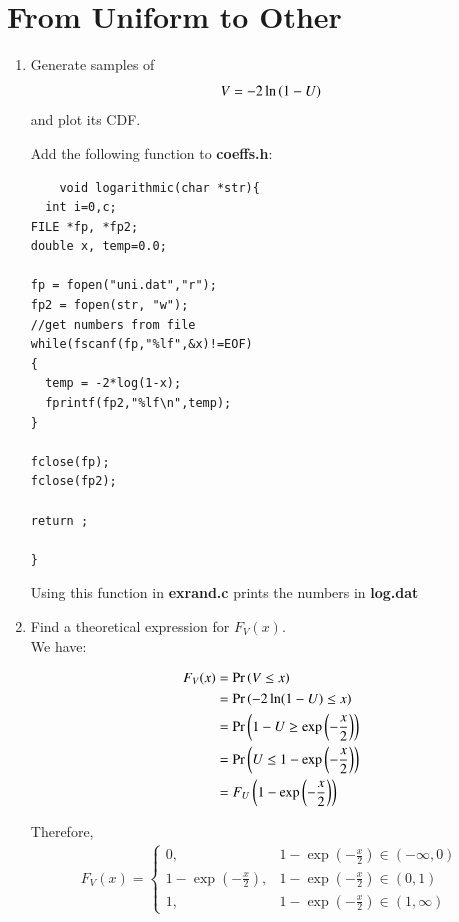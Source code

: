 \documentclass[journal,12pt,twocolumn]{IEEEtran}
\renewcommand\thesection{\arabic{section}}
\begin{document}
\section{From Uniform to Other}
\begin{enumerate}[label=\thesection.\arabic*
,ref=\thesection.\theenumi]
%
\item
Generate samples of 
%
\begin{equation}
V = -2\ln\left(1-U\right)
\end{equation}
%
and plot its CDF.  
\solution 

Add the following function to \textbf{coeffs.h}:
\begin{lstlisting}
    void logarithmic(char *str){
  int i=0,c;
FILE *fp, *fp2;
double x, temp=0.0;

fp = fopen("uni.dat","r");
fp2 = fopen(str, "w");
//get numbers from file
while(fscanf(fp,"%lf",&x)!=EOF)
{
  temp = -2*log(1-x);
  fprintf(fp2,"%lf\n",temp);
}

fclose(fp);
fclose(fp2);

return ;

}
    \end{lstlisting}

Using this function in \textbf{exrand.c} prints the numbers in 
\textbf{log.dat} 


\item Find a theoretical expression for $F_V(x)$.
\\
\solution  We have:
    
\begin{align}
F_V(x) &= \Pr\left(V \leq x\right) \\
&= \Pr\left(-2\ln(1-U) \leq x\right) \\
&= \Pr\left(1-U \geq	\exp{\left(-\frac{x}{2}\right)}\right) \\
&= \Pr\left(U \leq 1 - \exp{\left(-\frac{x}{2}\right)}\right) \\
&= F_U\left(1 - \exp{\left(-\frac{x}{2}\right)}\right) 
\end{align}

Therefore,
    \begin{align}
       F_V(x) =
        \begin{cases}
            0, & 1 - \exp{\left(-\frac{x}{2}\right)} \in (-\infty,0) \\
            1 - \exp{\left(-\frac{x}{2}\right)}, & 1 - \exp{\left(-\frac{x}{2}\right)} \in (0,1) \\
            1, & 1 - \exp{\left(-\frac{x}{2}\right)} \in (1, \infty)
        \end{cases}
    \end{align}
    

\end{enumerate}
\end{document}
